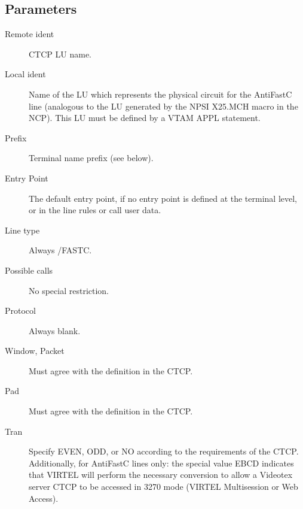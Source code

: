 \documentclass[letterpaper,10pt,english]{sphinxmanual}
\begin{document}

\ignorespaces 

\subsection{Parameters}
\label{\detokenize{connectivity_guide:index-79}}\label{\detokenize{connectivity_guide:id37}}\begin{description}
\item[{Remote ident}] \leavevmode
CTCP LU name.

\item[{Local ident}] \leavevmode
Name of the LU which represents the physical circuit for the AntiFastC line (analogous to the LU generated by the NPSI X25.MCH macro in the NCP). This LU must be defined by a VTAM APPL statement.

\item[{Prefix}] \leavevmode
Terminal name prefix (see below).

\item[{Entry Point}] \leavevmode
The default entry point, if no entry point is defined at the terminal level, or in the line rules or call user data.

\item[{Line type}] \leavevmode
Always /FASTC.

\item[{Possible calls}] \leavevmode
No special restriction.

\item[{Protocol}] \leavevmode
Always blank.

\item[{Window, Packet}] \leavevmode
Must agree with the definition in the CTCP.

\item[{Pad}] \leavevmode
Must agree with the definition in the CTCP.

\item[{Tran}] \leavevmode
Specify EVEN, ODD, or NO according to the requirements of the CTCP. Additionally, for AntiFastC lines only: the special value EBCD indicates that VIRTEL will perform the necessary conversion to allow a Videotex server CTCP to be accessed in 3270 mode (VIRTEL Multisession or Web Access).

\end{description}
\end{document}
